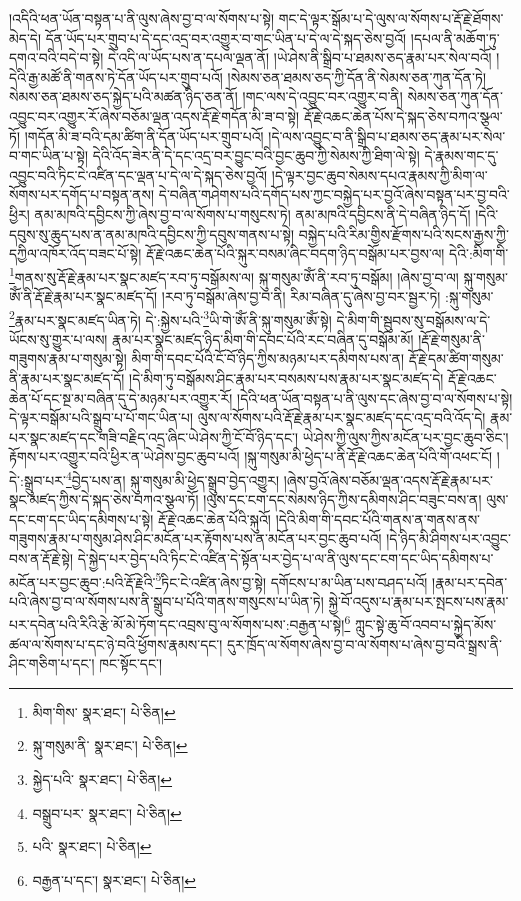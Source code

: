 །འདིའི་ཕན་ཡོན་བསྟན་པ་ནི་ལུས་ཞེས་བྱ་བ་ལ་སོགས་པ་སྟེ། གང་དེ་ལྟར་སྒོམ་པ་དེ་ལུས་ལ་སོགས་པ་རྡོ་རྗེ་ཐོགས་མེད་དེ། དོན་ཡོད་པར་གྲུབ་པ་དེ་དང་འདྲ་བར་འགྱུར་བ་གང་ཡིན་པ་དེ་ལ་དེ་སྐད་ཅེས་བྱའོ། །དཔལ་ནི་མཆོག་ཏུ་དགའ་བའི་བདེ་བ་སྟེ། དེ་འདི་ལ་ཡོད་པས་ན་དཔལ་ལྡན་ནོ། །ཡེ་ཤེས་ནི་སྒྲིབ་པ་ཐམས་ཅད་རྣམ་པར་སེལ་བའོ། །དེའི་རྒྱ་མཚོ་ནི་གནས་ཏེ་དོན་ཡོད་པར་གྲུབ་པའོ། །སེམས་ཅན་ཐམས་ཅད་ཀྱི་དོན་ནི་སེམས་ཅན་ཀུན་དོན་ཏེ། སེམས་ཅན་ཐམས་ཅད་སྐྱེད་པའི་མཚན་ཉིད་ཅན་ནོ། །གང་ལས་དེ་འབྱུང་བར་འགྱུར་བ་ནི། སེམས་ཅན་ཀུན་དོན་འབྱུང་བར་འགྱུར་རོ་ཞེས་བཅོམ་ལྡན་འདས་རྡོ་རྗེ་གདོན་མི་ཟ་བ་སྟེ། རྡོ་རྗེ་འཆང་ཆེན་པོས་དེ་སྐད་ཅེས་བཀའ་སྩལ་ཏོ། །གདོན་མི་ཟ་བའི་དམ་ཚིག་ནི་དོན་ཡོད་པར་གྲུབ་པའོ། །དེ་ལས་འབྱུང་བ་ནི་སྒྲིབ་པ་ཐམས་ཅད་རྣམ་པར་སེལ་བ་གང་ཡིན་པ་སྟེ། དེའི་འོད་ཟེར་ནི་དེ་དང་འདྲ་བར་བྱུང་བའི་བྱང་ཆུབ་ཀྱི་སེམས་ཀྱི་ཐིག་ལེ་སྟེ། དེ་རྣམས་གང་དུ་འབྱུང་བའི་ཏིང་ངེ་འཛིན་དང་ལྡན་པ་དེ་ལ་དེ་སྐད་ཅེས་བྱའོ། །དེ་ལྟར་བྱང་ཆུབ་སེམས་དཔའ་རྣམས་ཀྱི་མིག་ལ་སོགས་པར་དགོད་པ་བསྟན་ནས། དེ་བཞིན་གཤེགས་པའི་དགོད་པས་ཀྱང་བསྐྱེད་པར་བྱའོ་ཞེས་བསྟན་པར་བྱ་བའི་ཕྱིར། ནམ་མཁའི་དབྱིངས་ཀྱི་ཞེས་བྱ་བ་ལ་སོགས་པ་གསུངས་ཏེ། ནམ་མཁའི་དབྱིངས་ནི་དེ་བཞིན་ཉིད་དོ། །དེའི་དབུས་སུ་ཆུད་པས་ན་ནམ་མཁའི་དབྱིངས་ཀྱི་དབུས་གནས་པ་སྟེ། བསྐྱེད་པའི་རིམ་གྱིས་རྫོགས་པའི་སངས་རྒྱས་ཀྱི་དཀྱིལ་འཁོར་འོད་བཟང་པོ་སྟེ། རྡོ་རྗེ་འཆང་ཆེན་པོའི་སྐུར་བསམ་ཞིང་བདག་ཉིད་བསྒོམ་པར་བྱས་ལ། དེའི་:མིག་གི་\footnote{མིག་གིས་  སྣར་ཐང་།  པེ་ཅིན། }གནས་སུ་རྡོ་རྗེ་རྣམ་པར་སྣང་མཛད་རབ་ཏུ་བསྒོམས་ལ། སྐུ་གསུམ་ཨོཾ་ནི་རབ་ཏུ་བསྒོམ། །ཞེས་བྱ་བ་ལ། སྐུ་གསུམ་ཨོཾ་ནི་རྡོ་རྗེ་རྣམ་པར་སྣང་མཛད་དོ། །རབ་ཏུ་བསྒོམ་ཞེས་བྱ་བ་ནི། རིམ་བཞིན་དུ་ཞེས་བྱ་བར་སྦྱར་ཏེ། :སྐུ་གསུམ་\footnote{སྐུ་གསུམ་ནི་  སྣར་ཐང་།  པེ་ཅིན། }རྣམ་པར་སྣང་མཛད་ཡིན་ཏེ། དེ་:སྐྱེས་པའི་\footnote{སྐྱེད་པའི་  སྣར་ཐང་།  པེ་ཅིན། }ཡི་གེ་ཨོཾ་ནི་སྐུ་གསུམ་ཨོཾ་སྟེ། དེ་མིག་གི་སྦུབས་སུ་བསྒོམས་ལ་དེ་ཡོངས་སུ་གྱུར་པ་ལས། རྣམ་པར་སྣང་མཛད་ཉིད་མིག་གི་དབང་པོའི་རང་བཞིན་དུ་བསྒོམ་མོ། །རྡོ་རྗེ་གསུམ་ནི་གཟུགས་རྣམ་པ་གསུམ་སྟེ། མིག་གི་དབང་པོའི་ངོ་བོ་ཉིད་ཀྱིས་མཉམ་པར་དམིགས་པས་ན། རྡོ་རྗེ་དམ་ཚིག་གསུམ་ནི་རྣམ་པར་སྣང་མཛད་དོ། །དེ་མིག་ཏུ་བསྒོམས་ཤིང་རྣམ་པར་བསམས་པས་རྣམ་པར་སྣང་མཛད་དེ། རྡོ་རྗེ་འཆང་ཆེན་པོ་དང་སྔ་མ་བཞིན་དུ་དེ་མཉམ་པར་འགྱུར་རོ། །དེའི་ཕན་ཡོན་བསྟན་པ་ནི་ལུས་དང་ཞེས་བྱ་བ་ལ་སོགས་པ་སྟེ། དེ་ལྟར་བསྒོམ་པའི་སྒྲུབ་པ་པོ་གང་ཡིན་པ། ལུས་ལ་སོགས་པའི་རྡོ་རྗེ་རྣམ་པར་སྣང་མཛད་དང་འདྲ་བའི་འོད་དེ། རྣམ་པར་སྣང་མཛད་དང་གཟི་བརྗིད་འདྲ་ཞིང་ཡེ་ཤེས་ཀྱི་ངོ་བོ་ཉིད་དང་། ཡེ་ཤེས་ཀྱི་ལུས་ཀྱིས་མངོན་པར་བྱང་ཆུབ་ཅིང་། རྟོགས་པར་འགྱུར་བའི་ཕྱིར་ན་ཡེ་ཤེས་བྱང་ཆུབ་པའོ། །སྐུ་གསུམ་མི་ཕྱེད་པ་ནི་རྡོ་རྗེ་འཆང་ཆེན་པོའི་གོ་འཕང་ངོ། །དེ་:སྒྲུབ་པར་\footnote{བསྒྲུབ་པར་  སྣར་ཐང་།  པེ་ཅིན། }བྱེད་པས་ན། སྐུ་གསུམ་མི་ཕྱེད་སྒྲུབ་བྱེད་འགྱུར། །ཞེས་བྱའོ་ཞེས་བཅོམ་ལྡན་འདས་རྡོ་རྗེ་རྣམ་པར་སྣང་མཛད་ཀྱིས་དེ་སྐད་ཅེས་བཀའ་སྩལ་ཏོ། །ལུས་དང་ངག་དང་སེམས་ཉིད་ཀྱིས་དམིགས་ཤིང་བཟུང་བས་ན། ལུས་དང་ངག་དང་ཡིད་དམིགས་པ་སྟེ། རྡོ་རྗེ་འཆང་ཆེན་པོའི་སྐུའོ། །དེའི་མིག་གི་དབང་པོའི་གནས་ན་གནས་ནས་གཟུགས་རྣམ་པ་གསུམ་ཤེས་ཤིང་མངོན་པར་རྟོགས་པས་ན་མངོན་པར་བྱང་ཆུབ་པའོ། །དེ་ཉིད་མི་ཤིགས་པར་འབྱུང་བས་ན་རྡོ་རྗེ་སྟེ། དེ་སྐྱེད་པར་བྱེད་པའི་ཏིང་ངེ་འཛིན་དེ་སྟོན་པར་བྱེད་པ་ལ་ནི་ལུས་དང་ངག་དང་ཡིད་དམིགས་པ་མངོན་པར་བྱང་ཆུབ་:པའི་རྡོ་རྗེའི་\footnote{པའི་  སྣར་ཐང་།  པེ་ཅིན། }ཏིང་ངེ་འཛིན་ཞེས་བྱ་སྟེ། དགོངས་པ་མ་ཡིན་པས་བཤད་པའོ། །རྣམ་པར་དབེན་པའི་ཞེས་བྱ་བ་ལ་སོགས་པས་ནི་སྒྲུབ་པ་པོའི་གནས་གསུངས་པ་ཡིན་ཏེ། སྐྱེ་བོ་འདུས་པ་རྣམ་པར་སྤངས་པས་རྣམ་པར་དབེན་པའི་རིའི་རྩེ་མོ་མེ་ཏོག་དང་འབྲས་བུ་ལ་སོགས་པས་:བརྒྱན་པ་སྟེ།\footnote{བརྒྱན་པ་དང་།  སྣར་ཐང་།  པེ་ཅིན། } ཀླུང་སྟེ་ཆུ་བོ་འབབ་པ་སྐྱེད་མོས་ཚལ་ལ་སོགས་པ་དང་ཉེ་བའི་ཕྱོགས་རྣམས་དང་། དུར་ཁྲོད་ལ་སོགས་ཞེས་བྱ་བ་ལ་སོགས་པ་ཞེས་བྱ་བའི་སྒྲས་ནི་ཤིང་གཅིག་པ་དང་། ཁང་སྟོང་དང་། 